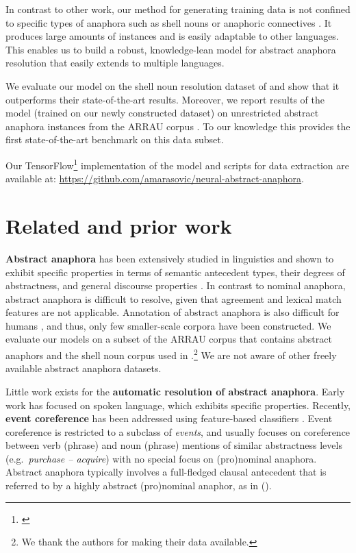 \documentclass[11pt,letterpaper]{article}
\begin{document}
In contrast to other work, 
our method for generating training data is not confined to specific types of anaphora such as shell nouns \citep{kolhatkar-hirst:2014:EMNLP2014} or anaphoric connectives \citep{stede:grishina:2016:demzufolge}. It produces large amounts of instances and is easily adaptable to other languages. This enables us to build a robust, knowledge-lean model for abstract anaphora resolution that
easily extends to multiple languages. 

We evaluate our model on the shell noun resolution dataset of \citet{kolhatkar-zinsmeister-hirst:2013:EMNLP}
and show that it outperforms their state-of-the-art results. 
Moreover, we report results of the model (trained on our newly constructed dataset) on unrestricted abstract anaphora instances from the
ARRAU corpus \cite{POESIO08.297,uryupina2016arrau}. To our knowledge this provides the first state-of-the-art benchmark on this data subset.

Our TensorFlow\footnote{\citet{tensorflow2015-whitepaper}} implementation of the model and scripts for data extraction are available at: \url{https://github.com/amarasovic/neural-abstract-anaphora}.
 	
	
	\section{Related and prior work} 

{\bf Abstract anaphora} has been extensively studied in linguistics and shown to exhibit specific properties in terms of semantic antecedent types, their degrees of abstractness, and general discourse properties \citep{Asher:abstractobj,webber1991structure}. In contrast to nominal anaphora, abstract anaphora is difficult to resolve, given that agreement and lexical match features are not applicable. Annotation of abstract anaphora is also difficult for humans \citep{DipperZinsmeister:12_11}, and thus, only few smaller-scale corpora have been constructed. We evaluate our models on a subset of the ARRAU corpus \citep{uryupina2016arrau} that contains abstract anaphors and the shell noun corpus used in \citet{kolhatkar-zinsmeister-hirst:2013:EMNLP}.\footnote{We thank the authors for making their data available.} 
We are not aware of other freely available abstract anaphora datasets.

Little work exists for the {\bf automatic resolution of abstract anaphora}. 
Early work \citep{EckertStrube:00,strube-muller:2003:ACL,Byron:04,mueller:08} has focused on spoken language, which exhibits specific properties.
Recently, {\bf event coreference} has been addressed  using feature-based classifiers \cite{jauhar-EtAl:2015:*SEM2015,LuNg:16}. Event coreference is restricted to a subclass of {\em events}, and usually focuses on coreference between verb (phrase) and noun (phrase) mentions of similar abstractness levels (e.g.\ {\em purchase -- acquire}) with no special focus on (pro)nominal anaphora. Abstract anaphora typically involves a full-fledged clausal antecedent that is referred to by a highly abstract (pro)nominal anaphor, as in ().
\end{document}
